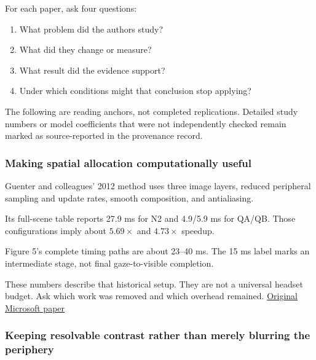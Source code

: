\hypertarget{04-visual-computing-ii-ch043-read-research-as-a-chain-of-questions-methods-and-bounded-conclusions}{}

For each paper, ask four questions:

\begin{enumerate}
\def\labelenumi{\arabic{enumi}.}
\tightlist
\item
  What problem did the authors study?
\item
  What did they change or measure?
\item
  What result did the evidence support?
\item
  Under which conditions might that conclusion stop applying?
\end{enumerate}

The following are reading anchors, not completed replications. Detailed study numbers or model coefficients that were not independently checked remain marked as source-reported in the provenance record.

\subsubsection{Making spatial allocation computationally useful}\label{04-visual-computing-ii-ch043-making-spatial-allocation-computationally-useful}

\hypertarget{04-visual-computing-ii-ch043-making-spatial-allocation-computationally-useful}{}

Guenter and colleagues' 2012 method uses three image layers, reduced peripheral sampling and update rates, smooth composition, and antialiasing.

Its full-scene table reports 27.9 ms for N2 and 4.9/5.9 ms for QA/QB. Those configurations imply about \(5.69\times\) and \(4.73\times\) speedup.

Figure 5's complete timing paths are about 23--40 ms. The 15 ms label marks an intermediate stage, not final gaze-to-visible completion.

These numbers describe that historical setup. They are not a universal headset budget. Ask which work was removed and which overhead remained. \href{https://www.microsoft.com/en-us/research/wp-content/uploads/2012/11/foveated_final15.pdf}{Original Microsoft paper}

\subsubsection{Keeping resolvable contrast rather than merely blurring the periphery}\label{04-visual-computing-ii-ch043-keeping-resolvable-contrast-rather-than-merely-blurring-the-periphery}

